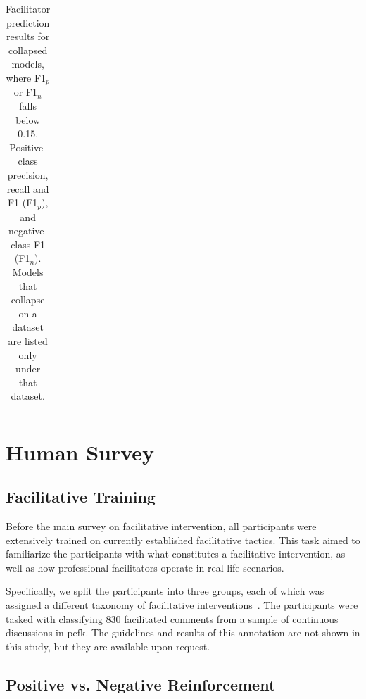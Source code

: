 \documentclass[11pt]{article}
\theoremstyle{definition}
\theoremstyle{plain}
\begin{document}
\begin{table}[ht]
\begin{tabular}{lrrrrr}
		\bottomrule
	\end{tabular}
	\caption{Facilitator prediction results for collapsed models, where F1$_p$ or F1$_n$ falls below 0.15. Positive-class precision, recall and F1 (F1$_p$), and negative-class F1 (F1$_n$). Models that collapse on a dataset are listed only under that dataset.}
	\label{tab:facilitator-prediction-collapsed}
\end{table}


\section{Human Survey}
\label{app:human-annotation}

\subsection{Facilitative Training}
\label{app:human-annotation:tactics}

Before the main survey on facilitative intervention, all participants were extensively trained on currently established facilitative tactics. This task aimed to familiarize the participants with what constitutes a facilitative intervention, as well as how professional facilitators operate in real-life scenarios.

Specifically, we split the participants into three groups, each of which was assigned a different taxonomy of facilitative interventions~\citep{chen-etal-2025-whow, schroeder-etal-2024-fora, ceri}. The participants were tasked with classifying 830 facilitated comments from a sample of continuous discussions in \ac{pefk}. The guidelines and results of this annotation are not shown in this study, but they are available upon request.


\subsection{Positive vs. Negative Reinforcement}
\label{app:human-annotation:positive-vs-negative}
\end{document}

